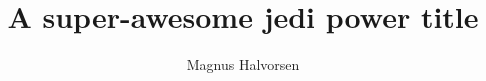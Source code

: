 \documentclass[]{report}
\title{A super-awesome jedi power title}
\author{Magnus Halvorsen}
\begin{document}
\maketitle

\begin{abstract}
\end{abstract}









\end{document}
